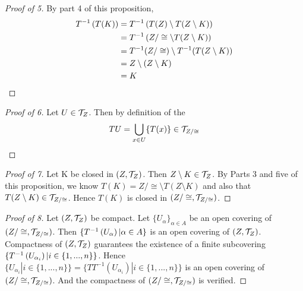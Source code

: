 \begin{prop}
\begin{proof}[Proof of 5]
        By part 4 of this proposition, 
        \begin{align*}
            T^{-1}\left( T(K)\right)&=T^{-1} \left( T(Z) \setminus T(Z \setminus K)\right) \\
            &= T^{-1}\left( Z/\cong \setminus T(Z \setminus K)\right)\\
            &=T^{-1}(Z/\cong) \setminus T^{-1}(T(Z\setminus K)) \\
            &= Z \setminus \left( Z \setminus K\right) \\
            &= K
        \end{align*}      
    \end{proof}
    \begin{proof}[Proof of 6]
        Let $U \in \mathcal{T}_Z$.
        Then by definition of the \QuotientSpaceTopology
        \begin{equation}
            TU= \bigcup_{x \in U} \{T(x)\}  \in \mathcal{T}_{Z/\cong}
        \end{equation}
    \end{proof}  
    \begin{proof}[Proof of 7] 
        Let K be closed in $(Z,\mathcal{T}_Z)$. 
        Then $Z \setminus K \in \mathcal{T}_Z$. 
        By Parts 3 and five of this proposition, we know $T(K) = Z/\cong \setminus T(Z\setminus K)$ and also that $T(Z\setminus K) \in \mathcal{T}_{Z/\cong}$. Hence $T(K)$ is closed in $(Z/\cong, \mathcal{T}_{Z/\cong})$. 
    \end{proof} 
    \begin{proof}[Proof of 8]
        Let $(Z,\mathcal{T}_Z)$ be compact. 
        Let $\{U_{\alpha}\}_{\alpha \in A}$ be an open covering of $(Z/\cong, \mathcal{T}_{Z/\cong})$. 
        Then $\{T^{-1}\left( U_{\alpha}\right) | \alpha \in A\}$ is an open covering of $(Z, \mathcal{T}_Z)$. 
        Compactness of $(Z, \mathcal{T}_Z)$ guarantees the existence of a finite subcovering $\{T^{-1}\left( U_{\alpha_i}\right) | i \in \{1, ..., n\}\}$. 
        Hence
        $\{U_{\alpha_i} | i \in \{1, ..., n\}\}=\{TT^{-1}(U_{\alpha_i}) | i \in \{1, ..., n\}\}$ is an open covering of $(Z/\cong, \mathcal{T}_{Z/\cong})$. 
         And the compactness of $(Z/\cong, \mathcal{T}_{Z/\cong})$ is verified. 
         

\end{proof}
\end{prop}
